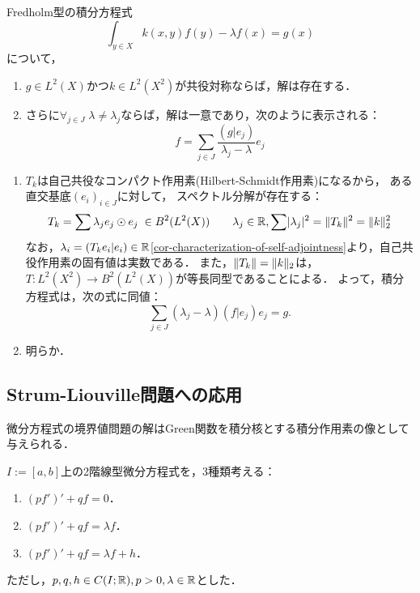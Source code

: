 \documentclass[uplatex,dvipdfmx]{jsreport}
\begin{document}
\begin{proposition}
    Fredholm型の積分方程式
    \[\int_{y\in X}k(x,y)f(y)-\lambda f(x)=g(x)\]
    について，
    \begin{enumerate}
        \item $g\in L^2(X)$かつ$k\in L^2(X^2)$が共役対称ならば，解は存在する．
        \item さらに$\forall_{j\in J}\;\lambda\ne\lambda_j$ならば，解は一意であり，次のように表示される：
        \[f=\sum_{j\in J}\frac{(g|e_j)}{\lambda_j-\lambda}e_j\]
    \end{enumerate}
\end{proposition}
\begin{Proof}\mbox{}
    \begin{enumerate}
        \item $T_k$は自己共役なコンパクト作用素(Hilbert-Schmidt作用素)になるから，
        ある直交基底$(e_i)_{i\in J}$に対して，
        スペクトル分解が存在する：
        \[T_k=\sum\lambda_je_j\odot e_j\;\in B^2(L^2(X))\qquad\lambda_j\in\mathbb{R},\sum\lvert\lambda_j\rvert^2=\|T_k\|^2=\|k\|^2_2\]
        なお，$\lambda_i=(T_ke_i|e_i)\in\mathbb{R}$\ref{cor-characterization-of-self-adjointness}より，自己共役作用素の固有値は実数である．
        また，$\|T_k\|=\|k\|_2$は，$T:L^2(X^2)\to B^2(L^2(X))$が等長同型であることによる．
        よって，積分方程式は，次の式に同値：
        \[\sum_{j\in J}(\lambda_j-\lambda)(f|e_j)e_j=g.\]
        \item 明らか．
    \end{enumerate}
\end{Proof}

\subsection{Strum-Liouville問題への応用}

\begin{tcolorbox}[colframe=ForestGreen, colback=ForestGreen!10!white,breakable,colbacktitle=ForestGreen!40!white,coltitle=black,fonttitle=\bfseries\sffamily,
title=]
    微分方程式の境界値問題の解はGreen関数を積分核とする積分作用素の像として与えられる．
\end{tcolorbox}

\begin{problem}
    $I:=[a,b]$上の2階線型微分方程式を，3種類考える：
    \begin{enumerate}
        \item $(pf')'+qf=0$．
        \item $(pf')'+qf=\lambda f$．
        \item $(pf')'+qf=\lambda f+h$．
    \end{enumerate}
    ただし，$p,q,h\in C(I;\mathbb{R}),p>0,\lambda\in\mathbb{R}$とした．
\end{problem}
\end{document}
